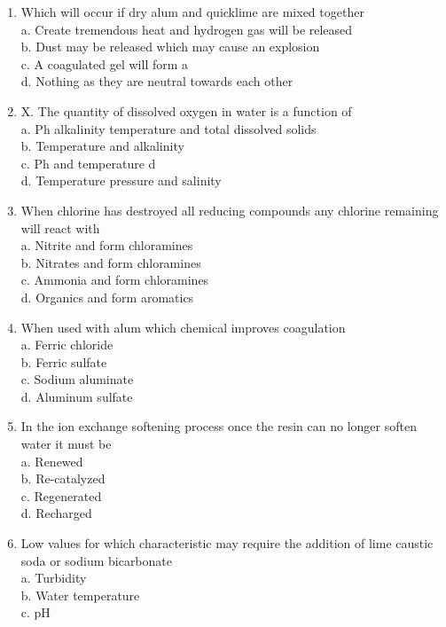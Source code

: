 \begin{enumerate}
\item Which will occur if dry alum and quicklime are mixed together\\
a.  Create tremendous heat and hydrogen gas will be released\\
b.  Dust may be released which may cause an explosion\\
c.  A coagulated gel will form  a\\
d.  Nothing as they are neutral towards each other\\
\item {X.  }The quantity of dissolved oxygen in water is a function of\\
a.  Ph alkalinity temperature and total dissolved solids\\
b.  Temperature and alkalinity\\
c.  Ph and temperature  d\\
d.  Temperature pressure and salinity\\
\item When chlorine has destroyed all reducing compounds any chlorine remaining will react with\\
a.  Nitrite and form chloramines\\
b.  Nitrates and form chloramines\\
c.  Ammonia and form chloramines\\
d.  Organics and form aromatics\\
\item When used with alum which chemical improves coagulation\\
a.  Ferric chloride\\
b.  Ferric sulfate\\
c.  Sodium aluminate\\
d.  Aluminum sulfate\\
\item In the ion exchange softening process once the resin can no longer soften water it must be\\
a.  Renewed\\
b.  Re-catalyzed\\
c.  Regenerated\\
d.  Recharged\\
\item Low values for which characteristic may require the addition of lime caustic soda or sodium bicarbonate\\
a.  Turbidity\\
b.  Water temperature\\
c.  pH \\

\end{enumerate}
